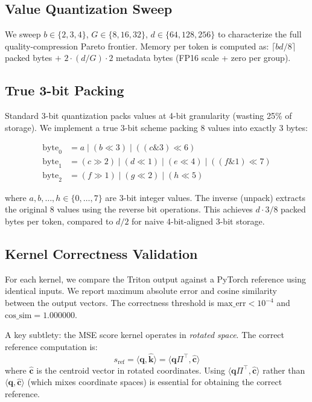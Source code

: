 \documentclass[10pt,twocolumn]{article}
\newcommand{\bm}[1]{\boldsymbol{#1}}
\begin{document}
\subsection{Value Quantization Sweep}

We sweep $b \in \{2, 3, 4\}$, $G \in \{8, 16, 32\}$, $d \in \{64, 128, 256\}$ to characterize the full quality-compression Pareto frontier. Memory per token is computed as: $\lceil bd/8 \rceil$ packed bytes $+$ $2 \cdot (d / G) \cdot 2$ metadata bytes (FP16 scale + zero per group).

\subsection{True 3-bit Packing}

Standard 3-bit quantization packs values at 4-bit granularity (wasting 25\% of storage). We implement a true 3-bit scheme packing 8 values into exactly 3 bytes:

\begin{align}
\text{byte}_0 &= a \mid (b \ll 3) \mid ((c \mathbin{\&} 3) \ll 6) \\
\text{byte}_1 &= (c \gg 2) \mid (d \ll 1) \mid (e \ll 4) \mid ((f \mathbin{\&} 1) \ll 7) \\
\text{byte}_2 &= (f \gg 1) \mid (g \ll 2) \mid (h \ll 5)
\end{align}

where $a, b, \ldots, h \in \{0, \ldots, 7\}$ are 3-bit integer values. The inverse (unpack) extracts the original 8 values using the reverse bit operations. This achieves $d \cdot 3 / 8$ packed bytes per token, compared to $d/2$ for naive 4-bit-aligned 3-bit storage.

\subsection{Kernel Correctness Validation}

For each kernel, we compare the Triton output against a PyTorch reference using identical inputs. We report maximum absolute error and cosine similarity between the output vectors. The correctness threshold is $\text{max\_err} < 10^{-4}$ and $\text{cos\_sim} = 1.000000$.

A key subtlety: the MSE score kernel operates in \emph{rotated space}. The correct reference computation is:
$$s_\text{ref} = \langle \bm{q}, \hat{\bm{k}} \rangle = \langle \bm{q} \Pi^\top, \hat{\bm{c}} \rangle$$
where $\hat{\bm{c}}$ is the centroid vector in rotated coordinates. Using $\langle \bm{q} \Pi^\top, \hat{\bm{c}} \rangle$ rather than $\langle \bm{q}, \hat{\bm{c}} \rangle$ (which mixes coordinate spaces) is essential for obtaining the correct reference.
\end{document}

